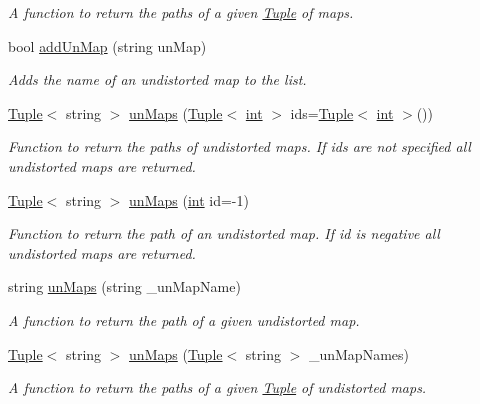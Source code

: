 \begin{DoxyCompactItemize}
\begin{DoxyCompactList}\small\item\em A function to return the paths of a given \mbox{\hyperlink{class_tuple}{Tuple}} of maps. \end{DoxyCompactList}\item 
bool \mbox{\hyperlink{class_settings_aeee4537bd39c18ca3a711a73c9c2277e}{add\+Un\+Map}} (string un\+Map)
\begin{DoxyCompactList}\small\item\em Adds the name of an undistorted map to the list. \end{DoxyCompactList}\item 
\mbox{\hyperlink{class_tuple}{Tuple}}$<$ string $>$ \mbox{\hyperlink{class_settings_a7cbf0234eaca6582ce982f0cf756d282}{un\+Maps}} (\mbox{\hyperlink{class_tuple}{Tuple}}$<$ \mbox{\hyperlink{draw_8hh_aa620a13339ac3a1177c86edc549fda9b}{int}} $>$ ids=\mbox{\hyperlink{class_tuple}{Tuple}}$<$ \mbox{\hyperlink{draw_8hh_aa620a13339ac3a1177c86edc549fda9b}{int}} $>$())
\begin{DoxyCompactList}\small\item\em Function to return the paths of undistorted maps. If ids are not specified all undistorted maps are returned. \end{DoxyCompactList}\item 
\mbox{\hyperlink{class_tuple}{Tuple}}$<$ string $>$ \mbox{\hyperlink{class_settings_a0619c378aff05b5762afe0280b40e07a}{un\+Maps}} (\mbox{\hyperlink{draw_8hh_aa620a13339ac3a1177c86edc549fda9b}{int}} id=-\/1)
\begin{DoxyCompactList}\small\item\em Function to return the path of an undistorted map. If id is negative all undistorted maps are returned. \end{DoxyCompactList}\item 
string \mbox{\hyperlink{class_settings_a6e62c5eb18f6abc4bcbcd11e018fda8b}{un\+Maps}} (string \+\_\+un\+Map\+Name)
\begin{DoxyCompactList}\small\item\em A function to return the path of a given undistorted map. \end{DoxyCompactList}\item 
\mbox{\hyperlink{class_tuple}{Tuple}}$<$ string $>$ \mbox{\hyperlink{class_settings_aa89550d142cb4101faf35af214f4edff}{un\+Maps}} (\mbox{\hyperlink{class_tuple}{Tuple}}$<$ string $>$ \+\_\+un\+Map\+Names)
\begin{DoxyCompactList}\small\item\em A function to return the paths of a given \mbox{\hyperlink{class_tuple}{Tuple}} of undistorted maps. \end{DoxyCompactList}\item 

\end{DoxyCompactItemize}

